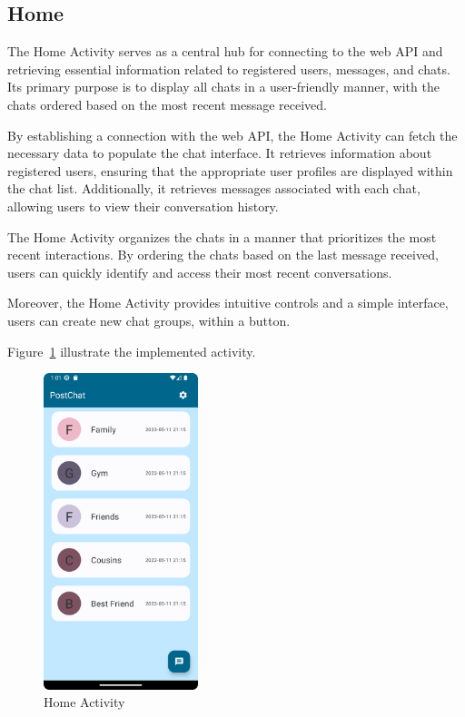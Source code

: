 \subsection{Home}
The Home Activity serves as a central hub for connecting to the web API and retrieving essential information related to registered users, messages, and chats. Its primary purpose is to display all chats in a user-friendly manner, with the chats ordered based on the most recent message received.

By establishing a connection with the web API, the Home Activity can fetch the necessary data to populate the chat interface. It retrieves information about registered users, ensuring that the appropriate user profiles are displayed within the chat list. Additionally, it retrieves messages associated with each chat, allowing users to view their conversation history.

The Home Activity organizes the chats in a manner that prioritizes the most recent interactions. By ordering the chats based on the last message received, users can quickly identify and access their most recent conversations.

Moreover, the Home Activity provides intuitive controls and a simple interface, users can create new chat groups, within a button.

Figure~\ref{fig:HA1} illustrate the implemented activity.

\begin{figure}[!ht]
	\centering
	\includegraphics[trim={0cm -3cm 0 -3cm}, width=0.4\textwidth]{./Chapter6/Figures/HomeActivity}
	\caption{Home Activity}
	\label{fig:HA1}
\end{figure}


